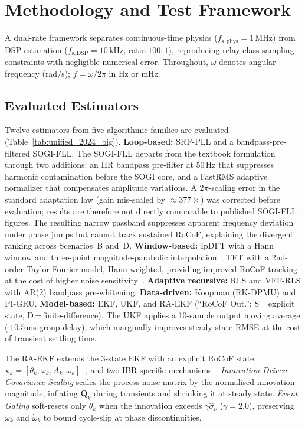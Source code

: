 \section{Methodology and Test Framework}
\label{sec:methodology}

A dual-rate framework separates continuous-time physics
($f_{\mathrm{s,phys}}=1$\,MHz) from DSP estimation ($f_{\mathrm{s,DSP}}=10$\,kHz,
ratio $100{:}1$), reproducing relay-class sampling constraints with
negligible numerical error. Throughout, $\omega$ denotes angular frequency
(rad/s); $f = \omega/2\pi$ in Hz or mHz.
\subsection{Evaluated Estimators}

Twelve estimators from five algorithmic families are evaluated
(Table~\ref{tab:unified_2024_big}).
\textbf{Loop-based:} SRF-PLL and a bandpass-pre-filtered SOGI-FLL.
The SOGI-FLL departs from the textbook formulation~\cite{Golestan2015}
through two additions: an IIR bandpass pre-filter at 50\,Hz that suppresses
harmonic contamination before the SOGI core, and a FastRMS adaptive normalizer
that compensates amplitude variations. A $2\pi$-scaling error in the standard
adaptation law (gain mis-scaled by ${\approx}377\times$) was corrected before
evaluation; results are therefore not directly comparable to published SOGI-FLL
figures. The resulting narrow passband suppresses apparent frequency deviation
under phase jumps but cannot track sustained RoCoF, explaining the divergent
ranking across Scenarios~B and~D.
\textbf{Window-based:} IpDFT with a Hann window and three-point
magnitude-parabolic interpolation~\cite{Quinn1994}; TFT with a 2nd-order
Taylor-Fourier model, Hann-weighted, providing improved RoCoF tracking at
the cost of higher noise sensitivity~\cite{PlatasGarza2011}.
\textbf{Adaptive recursive:} RLS and VFF-RLS with AR(2) bandpass pre-whitening.
\textbf{Data-driven:} Koopman (RK-DPMU) and PI-GRU.
\textbf{Model-based:} EKF, UKF, and RA-EKF (``RoCoF Out.'': S\,=\,explicit
state, D\,=\,finite-difference). The UKF applies a 10-sample output moving
average ($+0.5$\,ms group delay), which marginally improves steady-state
RMSE at the cost of transient settling time.

The RA-EKF extends the 3-state EKF with an explicit RoCoF state,
$\mathbf{x}_k = [\theta_k,\omega_k,A_k,\dot{\omega}_k]^\top$, and two
IBR-specific mechanisms~\cite{Ferrero2020EKF,Chamorro2021}.
\emph{Innovation-Driven Covariance Scaling} scales the process noise matrix
by the normalised innovation magnitude, inflating $\mathbf{Q}_k$ during
transients and shrinking it at steady state.
\emph{Event Gating} soft-resets only $\theta_k$ when the innovation exceeds
$\gamma\hat{\sigma}_\nu$ ($\gamma\!=\!2.0$), preserving $\omega_k$ and
$\dot{\omega}_k$ to bound cycle-slip at phase discontinuities.


